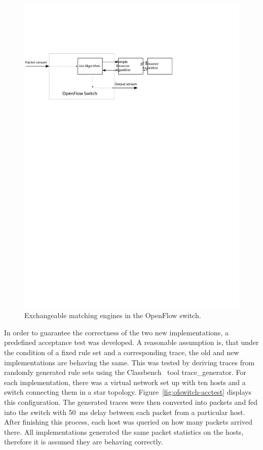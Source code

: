 \documentclass[a4paper,
		12pt,
		parskip=full,
		titlepage
		]{scrartcl}
\begin{document}
\begin{figure}[H]
\centering
\includegraphics[height=0.2\textheight]{images/ofswitch}
\caption{Exchangeable matching engines in the OpenFlow switch.}
\label{fig:ofswitch}
\end{figure}

In order to guarantee the correctness of the two new implementations, a predefined acceptance test was developed.
A reasonable assumption is, that under the condition of a fixed rule set and 
a corresponding trace, the old and new implementations are behaving the same.
This was tested by deriving traces from randomly generated rule sets using 
the Classbench~\cite{classbench_website} tool \textsf{trace\_generator}.
For each implementation, there was a virtual network set up with ten hosts and a switch connecting them in a star topology.
Figure~\ref{fig:ofswitch-acctest} displays this configuration.
The generated traces were then converted into packets and fed into the switch with 50\ ms delay between each packet from a particular host.
After finishing this process, each host was queried on how many packets arrived there.
All implementations generated the same packet statistics on the hosts, therefore it is assumed they are behaving correctly.
\end{document}
